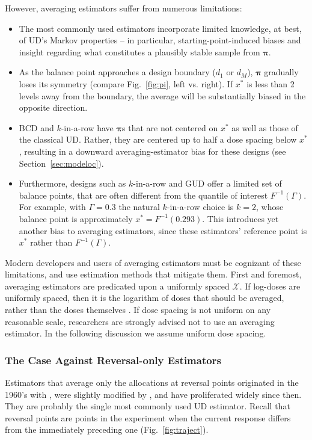 However, averaging estimators suffer from numerous limitations:

\begin{itemize}
\item The most commonly used estimators incorporate limited knowledge, at best, of UD's Markov properties -- in particular, starting-point-induced biases and insight regarding what constitutes a plausibly stable sample from $\boldsymbol{\pi}$.
\item As the balance point  approaches a design boundary ($d_1$ or $d_M$), $\boldsymbol{\pi}$ gradually loses its symmetry (compare Fig.~\ref{fig:pi}, left vs. right).  If  $x^*$ is less than 2 levels away from the boundary, the average will be substantially biased in the opposite direction.
\item BCD and $k$-in-a-row have $\boldsymbol{\pi}$s that are not centered on $x^*$ as well as those of the classical UD. Rather, they are centered up to half a dose spacing below $x^*$, resulting in a downward averaging-estimator bias for these designs (see Section~\ref{sec:modeloc}).
\item Furthermore, designs such as $k$-in-a-row and GUD offer a limited set of balance points, that are often different from the quantile of interest $F^{-1}(\Gamma)$. For example, with $\Gamma=0.3$ the natural $k$-in-a-row choice is $k=2$, whose balance point is approximately $x^*=F^{-1}(0.293)$. This introduces yet another bias to averaging estimators, since these estimators' reference point is $x^*$ rather than $F^{-1}(\Gamma)$.
\end{itemize}

Modern developers and users of averaging estimators must be cognizant of these limitations, and use estimation methods that mitigate them. First and foremost, averaging estimators are predicated upon a uniformly spaced $\mathcal{X}$. If log-doses are uniformly spaced, then it is the logarithm of doses that should be averaged, rather than the doses themselves \citep{Garc:Pere:Forc:1998,Oron07}. If dose spacing is not uniform on any reasonable scale, researchers are strongly advised not to use an averaging estimator. In the following discussion we assume uniform dose spacing.

\subsubsection{The Case Against Reversal-only Estimators}

Estimators that average only the allocations at reversal points originated in the 1960's with \cite{Weth:Chen:Vasu:est:1966}, were slightly modified by \cite{Choi:est:1971}, and have proliferated widely since then. They are probably the single most commonly used UD estimator. Recall that reversal points are points in the experiment when the current response differs from the immediately preceding one (Fig.~\ref{fig:traject}).

